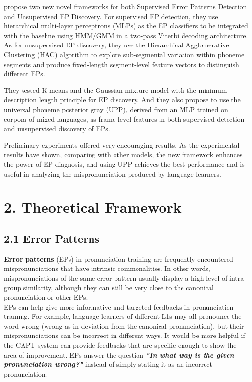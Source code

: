 \documentclass[nobib]{tufte-handout}
\begin{document}
\cite{wang2015supervised} propose two new novel frameworks for both Supervised Error Patterns Detection and Unsupervised EP Discovery.  For supervised EP detection,  they use hierarchical multi-layer perceptrons (MLPs) as the EP classifiers to be integrated with the baseline using HMM/GMM in a two-pass Viterbi decoding architecture.  As for unsupervised EP discovery, they use the Hierarchical Agglomerative Clustering (HAC) algorithm to explore sub-segmental variation within phoneme segments and produce fixed-length segment-level feature vectors to distinguish different EPs. 

They tested K-means  and the Gaussian mixture model with the minimum description length principle  for EP discovery.  And they also propose to use the universal phoneme posterior gray (UPP), derived from an MLP trained on corpora of mixed languages, as frame-level features in both supervised detection and unsupervised discovery of EPs. 

Preliminary experiments offered very encouraging results.  As the experimental results have shown, comparing with other models, the new framework enhances the power of EP diagnosis, and using UPP achieves the best performance and is useful in analyzing the mispronunciation produced by language learners.





\bigskip
\section{2. \textbf{Theoretical Framework}}
\subsection{2.1 \textbf{Error Patterns}}

\textbf{Error patterns} (EPs) in pronunciation training are frequently encountered mispronunciations that have intrinsic commonalities. In other words, mispronunciations of the same error pattern usually display a high level of intra-group similarity, although they can still be very close to the canonical pronunciation or other EPs.\\

EPs can help give more informative and targeted feedbacks in pronunciation training. For example, language learners of different L1s may all pronounce the word wrong (wrong as in deviation from the canonical pronunciation), but their mispronunciations can be incorrect in different ways. It would be more helpful if the CAPT system can provide feedbacks that are specific enough to show the area of improvement. EPs answer the question \textbf{\textit{"In what way is the given pronunciation wrong?"}} instead of simply stating it as an incorrect pronunciation.\\
\end{document}
